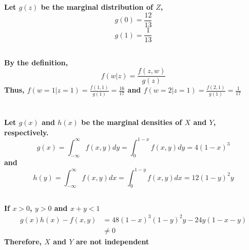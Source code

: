 \documentclass{article}
\begin{document}
        \subsection{}
            \paragraph{
                Let $g(z)$ be the marginal distribution of $Z$,
                $$g(0)=\frac{12}{13}$$
                $$g(1)=\frac{1}{13}$$
            }
        \subsection{}
            \paragraph{
                By the definition,
                $$f(w|z)=\frac{f(z,w)}{g(z)}$$
                Thus, $f(w=1|z=1)=\frac{f(1,1)}{g(1)}=\frac{16}{17}$ and $f(w=2|z=1)=\frac{f(2,1)}{g(1)}=\frac{1}{17}$
            }
    \section{}
        \subsection{}
            \paragraph{
                Let $g(x)$ and $h(x)$ be the marginal densities of $X$ and $Y$, respectively.
                $$g(x)=\int _{-\infty} ^\infty f(x,y) dy=\int _0 ^{1-x} f(x,y)dy=4(1-x)^3$$
                and
                $$h(y)=\int _{-\infty} ^\infty f(x,y) dx = \int _0 ^{1-y} f(x,y) dx=12(1-y)^2y$$
            }
        \subsection{}
            \paragraph{
                If $x>0$, $y>0$ and $x+y<1$
                \begin{equation}
                    \begin{split}
                        g(x)h(x)-f(x,y)
                        &= 48(1-x)^3(1-y)^2y-24y(1-x-y)\\
                        &\neq 0
                    \end{split}
                \end{equation}
                Therefore, $X$ and $Y$ are not independent
            }
\end{document}
